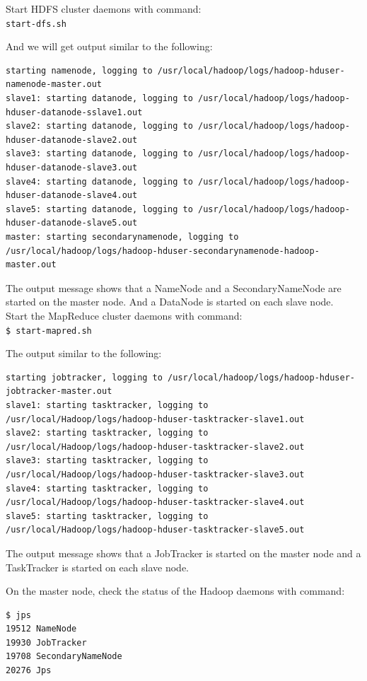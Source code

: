 Start HDFS cluster daemons with command: \\
\verb|start-dfs.sh|

And we will get output similar to the following:
\lstset{style=bashstyle}
\begin{lstlisting}[caption=Output of hte start-dfs.sh command]
starting namenode, logging to /usr/local/hadoop/logs/hadoop-hduser-namenode-master.out
slave1: starting datanode, logging to /usr/local/hadoop/logs/hadoop-hduser-datanode-sslave1.out
slave2: starting datanode, logging to /usr/local/hadoop/logs/hadoop-hduser-datanode-slave2.out
slave3: starting datanode, logging to /usr/local/hadoop/logs/hadoop-hduser-datanode-slave3.out
slave4: starting datanode, logging to /usr/local/hadoop/logs/hadoop-hduser-datanode-slave4.out
slave5: starting datanode, logging to /usr/local/hadoop/logs/hadoop-hduser-datanode-slave5.out
master: starting secondarynamenode, logging to /usr/local/hadoop/logs/hadoop-hduser-secondarynamenode-hadoop-master.out
\end{lstlisting}

The output message shows that a NameNode and a SecondaryNameNode are started on the master node. And a DataNode is started on each slave node. \\
Start the MapReduce cluster daemons with command: \\
\verb|$ start-mapred.sh|

The output similar to the following:
\lstset{style=bashstyle}
\begin{lstlisting}[caption=Output of the start-mapred.sh command]
starting jobtracker, logging to /usr/local/hadoop/logs/hadoop-hduser-jobtracker-master.out
slave1: starting tasktracker, logging to /usr/local/Hadoop/logs/hadoop-hduser-tasktracker-slave1.out
slave2: starting tasktracker, logging to /usr/local/Hadoop/logs/hadoop-hduser-tasktracker-slave2.out
slave3: starting tasktracker, logging to /usr/local/Hadoop/logs/hadoop-hduser-tasktracker-slave3.out
slave4: starting tasktracker, logging to /usr/local/Hadoop/logs/hadoop-hduser-tasktracker-slave4.out
slave5: starting tasktracker, logging to /usr/local/Hadoop/logs/hadoop-hduser-tasktracker-slave5.out
\end{lstlisting}

The output message shows that a JobTracker is started on the master node and a TaskTracker is started on each slave node.

On the master node, check the status of the Hadoop daemons with command:
\begin{verbatim}
$ jps
19512 NameNode
19930 JobTracker
19708 SecondaryNameNode
20276 Jps
\end{verbatim}

